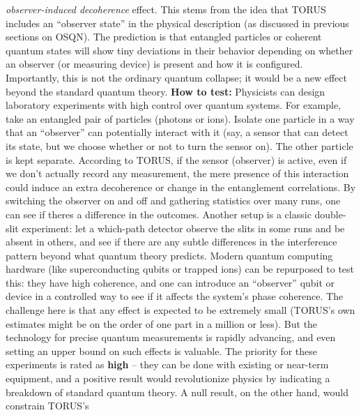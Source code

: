 \documentclass[
]{article}
\begin{document}
\begin{itemize}
  \emph{observer-induced decoherence} effect. This stems from the idea
  that TORUS includes an ``observer state'' in the physical description
  (as discussed in previous sections on OSQN). The prediction is that
  entangled particles or coherent quantum states will show tiny
  deviations in their behavior depending on whether an observer (or
  measuring device) is present and how it is configured\hspace{0pt}.
  Importantly, this is not the ordinary quantum collapse; it would be a
  new effect beyond the standard quantum theory. \textbf{How to test:}
  Physicists can design laboratory experiments with high control over
  quantum systems. For example, take an entangled pair of particles
  (photons or ions). Isolate one particle in a way that an ``observer''
  can potentially interact with it (say, a sensor that can detect its
  state, but we choose whether or not to turn the sensor on). The other
  particle is kept separate. According to TORUS, if the sensor
  (observer) is active, even if we don't actually record any
  measurement, the mere presence of this interaction could induce an
  extra decoherence or change in the entanglement correlations. By
  switching the observer on and off and gathering statistics over many
  runs, one can see if there\textquotesingle s a difference in the
  outcomes\hspace{0pt}. Another setup is a classic double-slit
  experiment: let a which-path detector observe the slits in some runs
  and be absent in others, and see if there are any subtle differences
  in the interference pattern beyond what quantum theory predicts.
  Modern quantum computing hardware (like superconducting qubits or
  trapped ions) can be repurposed to test this: they have high
  coherence, and one can introduce an ``observer'' qubit or device in a
  controlled way to see if it affects the system's phase
  coherence\hspace{0pt}. The challenge here is that any effect is
  expected to be extremely small (TORUS's own estimates might be on the
  order of one part in a million or less\hspace{0pt}). But the
  technology for precise quantum measurements is rapidly advancing, and
  even setting an upper bound on such effects is valuable. The priority
  for these experiments is rated as \textbf{high} -- they can be done
  with existing or near-term equipment, and a positive result would
  revolutionize physics by indicating a breakdown of standard quantum
  theory. A null result, on the other hand, would constrain TORUS's

\end{itemize}
\end{document}
